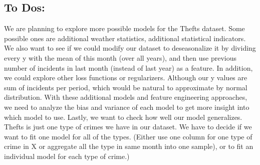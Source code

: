 \documentclass{article}
\begin{document}
\subsection*{To Dos:}
We are planning to explore more possible models for the Thefts dataset. Some possible ones are additional weather statistics, additional statistical indicators.  We also want to see if we could modify our dataset to deseasonalize it by dividing every y with the mean of this month (over all years), and then use previous number of incidents in last month (instead of last year) as a feature.  In addition, we could explore other loss functions or regularizers. Although our y values are sum of incidents per period, which would be natural to approximate by normal distribution.  With these additional models and feature engineering approaches, we need to analyze the bias and variance of each model to get more insight into which model to use.  Lastly, we want to check how well our model generalizes. Thefts is just one type of crimes we have in our dataset. We have to decide if we want to fit one model for all of the types. (Either use one column for one type of crime in X or aggregate all the type in same month into one sample), or to fit an individual model for each type of crime.) 
\end{document}
